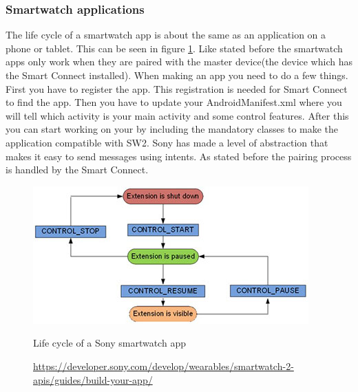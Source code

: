 \subsubsection{Smartwatch applications}
\label{subsubsec:sw_app}
The life cycle of a smartwatch app is about the same as an application on a phone or tablet. This can be seen in figure \ref{fig:sw2_lifecycle}. Like stated before the smartwatch apps only work when they are paired with the master device(the device which has the Smart Connect installed). When making an app you need to do a few things. First you have to register the app. This registration is needed for Smart Connect to find the app. \pend
Then you have to update your AndroidManifest.xml where you will tell which activity is your main activity and some control features. After this you can start working on your by including the mandatory classes to make the application compatible with SW2. \pend  
Sony has made a level of abstraction that makes it easy to send messages using intents. As stated before the pairing process is handled by the Smart Connect. 
\begin{figure}
\begin{center}
\includegraphics[scale=0.5]{images/applifecycle.jpg}
\end{center}
  \caption{Life cycle of a Sony smartwatch app}
  \label{fig:sw2_lifecycle}
  \caption*{\url{https://developer.sony.com/develop/wearables/smartwatch-2-apis/guides/build-your-app/}}
\end{figure}